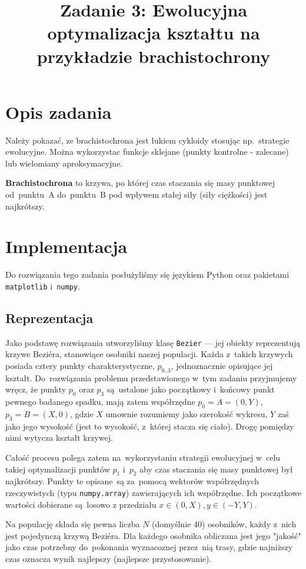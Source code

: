 \documentclass{classrep}
\author{
  \studentinfo{Cezar Pokorski}{138077} \and
  \studentinfo{Artur Czajka}{} 
}
\title{Zadanie 3: Ewolucyjna optymalizacja kształtu na przykładzie brachistochrony}
\begin{document}
\maketitle

\section{Opis zadania}
Należy pokazać, ze brachistochrona jest łukiem cykloidy stosując np.~strategie
ewolucyjne. Można wykorzystac funkcje sklejane (punkty kontrolne - zalecane) 
lub wielomiany aproksymacyjne.

\textbf{Brachistochrona} to krzywa, po której czas staczania się masy punktowej od~punktu~A
do~punktu~B pod wpływem stałej siły (siły ciężkości) jest najkrótszy. 



\section{Implementacja}
Do rozwiązania tego zadania posłużyliśmy się językiem Python oraz pakietami \texttt{matplotlib} 
i~\texttt{numpy}. 

\subsection{Reprezentacja}
Jako podstawę rozwiązania utworzyliśmy klasę \texttt{Bezier} --- jej obiekty reprezentują
krzywe Beziéra, stanowiące osobniki naszej populacji. Każda z~takich krzywych posiada cztery
punkty charakterystyczne, $p_{0..3}$, jednoznacznie opisujące jej kształt. Do~rozwiązania
problemu przedstawionego w~tym zadaniu przyjmujemy wręcz, że punkty $p_0$ oraz $p_3$ są~ustalone
jako początkowy i~końcowy punkt pewnego badanego spadku, mają zatem współrzędne $p_0 = A = (0, Y)$,
$p_3 = B = (X, 0)$, gdzie $X$ umownie rozumiemy jako szerokość wykresu, $Y$ zaś jako jego wysokość 
(jest to wysokość, z~której stacza się ciało). Drogę pomiędzy nimi wytycza kształt krzywej.

Całość procesu polega zatem na~wykorzystaniu strategii ewolucyjnej w~celu takiej optymalizacji
punktów $p_1$ i~$p_2$ aby czas staczania się masy punktowej był najkrótszy.  Punkty te opisane~są 
za~pomocą wektorów współrzędnych rzeczywistych (typu \texttt{numpy.array}) zawierających ich
współrzędne. Ich początkowe wartości dobierane są~losowo z przedziału $x\in(0,X), y\in(-Y,Y)$.

Na populację składa się pewna liczba $N$ (domyślnie 40) osobników, każdy z~nich jest pojedynczą
krzywą Beziéra. Dla każdego osobnika obliczana jest jego "jakość" jako czas potrzebny do~pokonania
wyznacoznej przez~nią trasy, gdzie najniższy czas oznacza wynik najlepszy (najlepsze przystosowanie).
\end{document}
